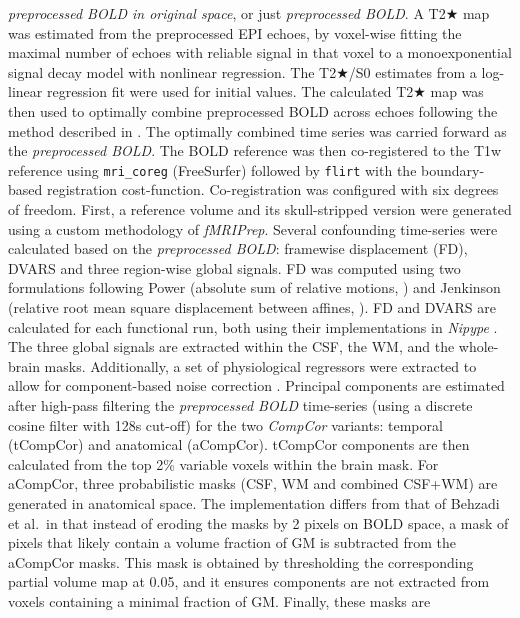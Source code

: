 \documentclass[
]{article}
\begin{document}
\begin{description}
\emph{preprocessed BOLD in original space}, or just \emph{preprocessed
BOLD}. A T2★ map was estimated from the preprocessed EPI echoes, by
voxel-wise fitting the maximal number of echoes with reliable signal in
that voxel to a monoexponential signal decay model with nonlinear
regression. The T2★/S0 estimates from a log-linear regression fit were
used for initial values. The calculated T2★ map was then used to
optimally combine preprocessed BOLD across echoes following the method
described in \citep{posse_t2s}. The optimally combined time series was
carried forward as the \emph{preprocessed BOLD}. The BOLD reference was
then co-registered to the T1w reference using \texttt{mri\_coreg}
(FreeSurfer) followed by \texttt{flirt} \citep[FSL
6.0.5.1:57b01774,][]{flirt} with the boundary-based registration
\citep{bbr} cost-function. Co-registration was configured with six
degrees of freedom. First, a reference volume and its skull-stripped
version were generated using a custom methodology of \emph{fMRIPrep}.
Several confounding time-series were calculated based on the
\emph{preprocessed BOLD}: framewise displacement (FD), DVARS and three
region-wise global signals. FD was computed using two formulations
following Power (absolute sum of relative motions,
\citet{power_fd_dvars}) and Jenkinson (relative root mean square
displacement between affines, \citet{mcflirt}). FD and DVARS are
calculated for each functional run, both using their implementations in
\emph{Nipype} \citep[following the definitions by][]{power_fd_dvars}.
The three global signals are extracted within the CSF, the WM, and the
whole-brain masks. Additionally, a set of physiological regressors were
extracted to allow for component-based noise correction
\citep[\emph{CompCor},][]{compcor}. Principal components are estimated
after high-pass filtering the \emph{preprocessed BOLD} time-series
(using a discrete cosine filter with 128s cut-off) for the two
\emph{CompCor} variants: temporal (tCompCor) and anatomical (aCompCor).
tCompCor components are then calculated from the top 2\% variable voxels
within the brain mask. For aCompCor, three probabilistic masks (CSF, WM
and combined CSF+WM) are generated in anatomical space. The
implementation differs from that of Behzadi et al.~in that instead of
eroding the masks by 2 pixels on BOLD space, a mask of pixels that
likely contain a volume fraction of GM is subtracted from the aCompCor
masks. This mask is obtained by thresholding the corresponding partial
volume map at 0.05, and it ensures components are not extracted from
voxels containing a minimal fraction of GM. Finally, these masks are

\end{description}
\end{document}
